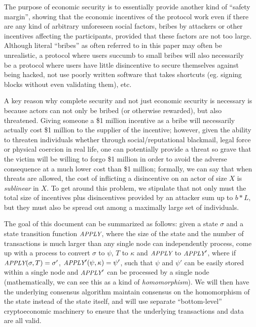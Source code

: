\documentclass[11pt,a4paper]{article}
\theoremstyle{plain}
\theoremstyle{definition}
\theoremstyle{remark}
\newcommand{\makeintoafunction}[1]{\textit{\uppercase{\small #1}}}
\newcommand{\APPLY}{\makeintoafunction{apply}}
\begin{document}
The purpose of economic security is to essentially provide another kind of ``safety margin'', showing that the economic incentives of the protocol work even if there are any kind of arbitrary unforeseen social factors, bribes by attackers or other incentives affecting the participants, provided that these factors are not too large. Although literal ``bribes'' as often referred to in this paper may often be unrealistic, a protocol where users succumb to small bribes will also necessarily be a protocol where users have little disincentive to secure themselves against being hacked, not use poorly written software that takes shortcuts (eg. signing blocks without even validating them), etc.

A key reason why complete security and not just economic security is necessary is because actors can not only be bribed (or otherwise rewarded), but also threatened. Giving someone a \$1 million incentive as a bribe will necessarily actually cost \$1 million to the supplier of the incentive; however, given the ability to threaten individuals whether through social/reputational blackmail, legal force or physical coercion in real life, one can potentially provide a threat so grave that the victim will be willing to forgo \$1 million in order to avoid the adverse consequence at a much lower cost than \$1 million; formally, we can say that when threats are allowed, the cost of inflicting a disincentive on an actor of size $X$ is \emph{sublinear} in $X$. To get around this problem, we stipulate that not only must the total size of incentives plus disincentives provided by an attacker sum up to $b * L$, but they must also be spread out among a maximally large set of individuals.

The goal of this document can be summarized as follows: given a state $\sigma$ and a state transition function $\APPLY$, where the size of the state and the number of transactions is much larger than any single node can independently process, come up with a process to convert $\sigma$ to $\psi$, $T$ to $\kappa$ and $\APPLY$ to $\APPLY'$, where if $\APPLY(\sigma, T) = \sigma'$, $\APPLY'(\psi, \kappa) = \psi'$, such that $\psi$ and $\psi'$ can be easily stored within a single node and $\APPLY'$ can be processed by a single node (mathematically, we can see this as a kind of \emph{homomorphism}). We will then have the underlying consensus algorithm maintain consensus on the homomorphism of the state instead of the state itself, and will use separate ``bottom-level'' cryptoeconomic machinery to ensure that the underlying transactions and data are all valid.
\end{document}
